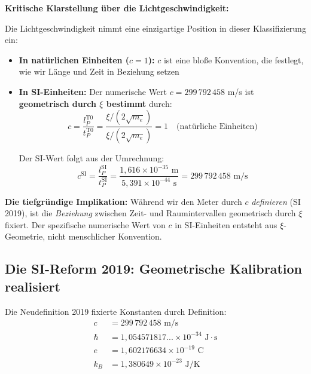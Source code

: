 \documentclass[12pt,a4paper]{article}
\begin{document}
	\begin{warning}
		\textbf{Kritische Klarstellung {\"u}ber die Lichtgeschwindigkeit:}
		
		Die Lichtgeschwindigkeit nimmt eine einzigartige Position in dieser Klassifizierung ein:
		
		\begin{itemize}
			\item \textbf{In nat{\"u}rlichen Einheiten ($c = 1$):} $c$ ist eine blo{\ss}e Konvention, die festlegt, wie wir L{\"a}nge und Zeit in Beziehung setzen
			
			\item \textbf{In SI-Einheiten:} Der numerische Wert $c = 299\,792\,458$ m/s ist \textbf{geometrisch durch $\xi$ bestimmt} durch:
			\begin{equation}
				c = \frac{l_P^{\text{T0}}}{t_P^{\text{T0}}} = \frac{\xi/(2\sqrt{m_e})}{\xi/(2\sqrt{m_e})} = 1 \quad \text{(nat{\"u}rliche Einheiten)}
			\end{equation}
			
			Der SI-Wert folgt aus der Umrechnung:
			\begin{equation}
				c^{\text{SI}} = \frac{l_P^{\text{SI}}}{t_P^{\text{SI}}} = \frac{1{,}616 \times 10^{-35} \text{ m}}{5{,}391 \times 10^{-44} \text{ s}} = 299\,792\,458 \text{ m/s}
			\end{equation}
		\end{itemize}
		
		\textbf{Die tiefgr{\"u}ndige Implikation:} W{\"a}hrend wir den Meter durch $c$ \emph{definieren} (SI 2019), ist die \emph{Beziehung} zwischen Zeit- und Raumintervallen geometrisch durch $\xi$ fixiert. Der spezifische numerische Wert von $c$ in SI-Einheiten entsteht aus $\xi$-Geometrie, nicht menschlicher Konvention.
	\end{warning}
	
	\subsection{Die SI-Reform 2019: Geometrische Kalibration realisiert}
	
	Die Neudefinition 2019 fixierte Konstanten durch Definition:
	\begin{align}
		c &= 299\,792\,458 \text{ m/s} \\
		\hbar &= 1{,}054571817... \times 10^{-34} \text{ J}\cdot\text{s} \\
		e &= 1{,}602176634 \times 10^{-19} \text{ C} \\
		k_B &= 1{,}380649 \times 10^{-23} \text{ J/K}
	\end{align}
	
\end{document}
